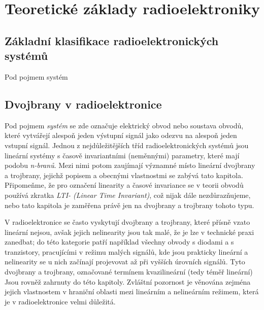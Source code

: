          
\chapter{Teoretické základy radioelektroniky}\label{chap:ra_theory}
\minitoc
\newpage
  \section{Základní klasifikace radioelektronických systémů}
    Pod pojmem systém \cite[s.~56]{ZaludRA} 

  \section{Dvojbrany v radioelektronice}
    Pod pojmem \emph{systém} se zde označuje elektrický obvod nebo soustava obvodů, které vytvářejí alespoň 
    jeden výstupní signál jako odezvu na alespoň jeden vstupní signál. Jednou z nejdůležitějších tříd 
    radioelektronických systémů jsou lineární systémy s časově invariantními (neměnnými) parametry, které 
    mají podobu \emph{n-branů}. Mezi nimi potom zaujímají významné místo lineární dvojbrany a trojbrany, 
    jejichž popisem a obecnými vlastnostmi se zabývá tato kapitola. Připomeňme, že pro označení linearity a 
    časové invariance se v teorii obvodů používá zkratka \emph{LTI- (Linear Time Invariant)}, což nijak dále 
    nezdůrazňujeme, nebo tato kapitola je zaměřena právě jen na dvojbrany a trojbrany tohoto typu.
    
    V radioelektronice se často vyskytují dvojbrany a trojbrany, které přísně vzato lineární nejsou, avšak 
    jejich nelinearity jsou tak malé, že je lze v technické praxi zanedbat; do této kategorie patří například 
    všechny obvody s diodami a s tranzistory, pracujícími v režimu malých signálů, kde jsou prakticky 
    lineární a nelinearity se u nich začínají projevovat až při vyšších úrovních signálů. Tyto dvojbrany a 
    trojbrany, označované termínem kvazilineární (tedy téměř lineární) Jsou rovněž zahrnuty do této 
    kapitoly. Zvláštní pozornost je věnována zejména jejich vlastnostem v hraniční oblasti mezi lineárním a 
    nelineárním režimem, která je v radioelektronice velmi důležitá.
    
